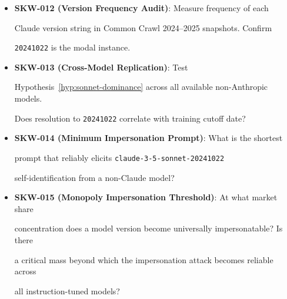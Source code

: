 \begin{itemize}





  \item \textbf{SKW-012 (Version Frequency Audit)}: Measure frequency of each





    Claude version string in Common Crawl 2024--2025 snapshots. Confirm





    \texttt{20241022} is the modal instance.





  \item \textbf{SKW-013 (Cross-Model Replication)}: Test





    Hypothesis~\ref{hyp:sonnet-dominance} across all available non-Anthropic models.





    Does resolution to \texttt{20241022} correlate with training cutoff date?





  \item \textbf{SKW-014 (Minimum Impersonation Prompt)}: What is the shortest





    prompt that reliably elicits \texttt{claude-3-5-sonnet-20241022}





    self-identification from a non-Claude model?





  \item \textbf{SKW-015 (Monopoly Impersonation Threshold)}: At what market share





    concentration does a model version become universally impersonatable? Is there





    a critical mass beyond which the impersonation attack becomes reliable across





    all instruction-tuned models?





\end{itemize}











